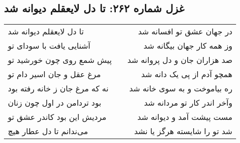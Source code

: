 \begin{center}
\section*{غزل شماره ۲۶۲: تا دل لایعقلم دیوانه شد}
\label{sec:262}
\begin{longtable}{l p{0.5cm} r}
تا دل لایعقلم دیوانه شد
&&
در جهان عشق تو افسانه شد
\\
آشنایی یافت با سودای تو
&&
وز همه کار جهان بیگانه شد
\\
پیش شمع روی چون خورشید تو
&&
صد هزاران جان و دل پروانه شد
\\
مرغ عقل و جان اسیر دام تو
&&
همچو آدم از پی یک دانه شد
\\
نه که مرغ جان ز خانه رفته بود
&&
ره بیاموخت و به سوی خانه شد
\\
بود تردامن در اول چون زنان
&&
وآخر اندر کار تو مردانه شد
\\
مردیش این بود کاندر عشق تو
&&
مست پیشت آمد و دیوانه شد
\\
می‌ندانم تا دل عطار هیچ
&&
شد تو را شایسته هرگز یا نشد
\\
\end{longtable}
\end{center}
